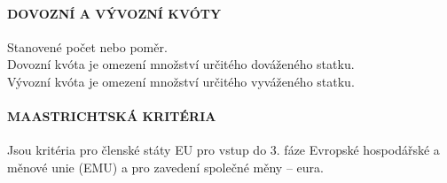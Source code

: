 \paragraph*{DOVOZNÍ A VÝVOZNÍ KVÓTY}
Stanovené počet nebo poměr. \\
Dovozní kvóta je omezení množství určitého dováženého statku. \\
Vývozní kvóta je omezení množství určitého vyváženého statku.

\paragraph*{MAASTRICHTSKÁ KRITÉRIA}
Jsou kritéria pro členské státy EU pro vstup do 3. fáze Evropské hospodářské a měnové unie (EMU) a pro zavedení společné měny -- eura.
